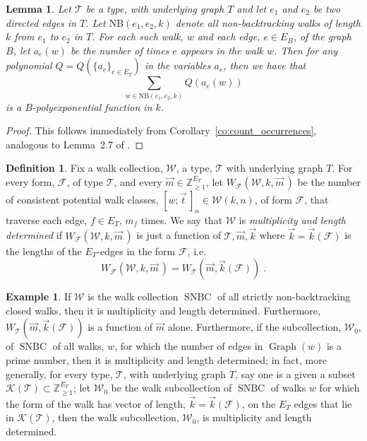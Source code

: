 \documentclass{memo-l}
\theoremstyle{plain}
\theoremstyle{definition}
\numberwithin{section}{chapter}
\numberwithin{equation}{chapter}
\DeclareMathOperator{\Graph}{Graph}
\DeclareMathOperator{\SNBC}{SNBC}
\newcommand{\potwalkclass}{[w;\vec t\,]_n}
\theoremstyle{plain}
\newtheorem{lem}[theorem]{Lemma}
\theoremstyle{definition}
\newtheorem{defn}[theorem]{Definition}
\newtheorem{ex}[theorem]{Example}
\newcommand\ZZ{\mathbb{Z}}
\newcommand\cF{\mathcal{F}}
\newcommand\cK{\mathcal{K}}
\newcommand\cT{\mathcal{T}}
\newcommand\cW{\mathcal{W}}
\begin{document}
\begin{lem}\label{lem:lettering_polyexponential} Let
\( \cT \) be a type, with underlying graph \( T \) and let \( e_1\) and \(
e_2 \) be two directed edges in \( T \). 
Let \( \mathrm{NB}(e_1,e_2,k)
\) denote all non-backtracking
walks of length \( k \) from \( e_1 \) to \(e_2\) in \( T
\). For each such walk, \( w \) and each edge, \( e \in E_B \), of the
graph \( B \), let \( a_e(w) \) be the number of times \( e \) appears in
the walk \( w \). Then for any polynomial \( Q=Q( \{ a_e\}_{e \in E_T}) \)
in the variables \( a_e \), then we have that \[ \sum_{w \in
\mathrm{NB}(e_1,e_2,k)} Q(a_e(w)) \] is a \(B\)-polyexponential function in
\(k\).  \end{lem} 
\begin{proof}
This follows immediately from Corollary~\ref{co:count_occurrences},
analogous to Lemma~2.7 of
\cite{friedman_random_graphs}.
\end{proof}

\begin{defn} Fix a walk
collection, \( \cW \), a type, \( \cT \) with underlying graph \( T \). For
every form, \( \cF \), of type \( \cT \), and every \( \vec m \in \ZZ_{\geq
1}^{E_T} \), let \( W_\cF(\cW,k,\vec m\,) \) be the number of consistent
potential walk classes, \( \potwalkclass \in \cW(k,n) \), of form \( \cF
\), that traverse each edge, \( f \in E_T \), \(m_f\) times. We say that \(
\cW \) is \emph{multiplicity and length determined} if \( W_\cF(\cW,k, \vec
m\,) \) is just a function of \( \cT, \vec m, \vec k\) where \( \vec k =
\vec k(\cF) \) is the lengths of the \( E_T\)-edges in the form \( \cF \),
i.e.  \begin{equation}\label{equ:multiplicity_determined} W_\cF(\cW,k, \vec
m\,) = W_\cT(\vec m, \vec k(\cF)) \;. \end{equation} 
\end{defn}

\begin{ex} If \( \cW \) is the walk collection \( \SNBC \) of all strictly
non-backtracking closed walks, then it is multiplicity and length
determined. Furthermore, $W_\cT(\vec m,\vec k(\cF))$
is a function of \( \vec m \) alone.
Furthermore, if the subcollection, \( \cW_0 \), of \( \SNBC \) of all
walks, \( w \), for which the number of edges in \( \Graph(w) \) is a prime
number, then it is multiplicity and length determined; in fact, more
generally, for every type, \( \cT \), with underlying graph \(T \), say one
is a given a subset \( \cK(\cT) \subset \ZZ_{\geq 1}^{E_T} \); let \( \cW_0 \)
be the walk subcollection of \( \SNBC \) of walks \( w \) for which the
form of the walk has vector of length, \( \vec k = \vec k(\cF) \), on the
\( E_T \) edges that lie in \( \cK(\cT) \), then the walk subcollection,
\( \cW_0 \), is multiplicity and length determined.  \end{ex}
\end{document}
